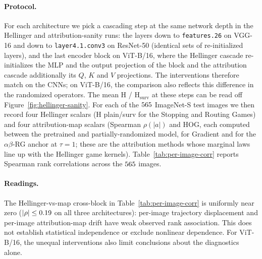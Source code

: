 \documentclass[twoside]{article}
\newcommand{\1}{\mathbf{1}}
\begin{document}
\paragraph{Protocol.}
For each architecture we pick a cascading step at the same network depth in the Hellinger
and attribution-sanity runs: the layers down to \texttt{features.26} on VGG-16 and down to
\texttt{layer4.1.conv3} on ResNet-50 (identical sets of re-initialized layers), and the last
encoder block on ViT-B/16, where the Hellinger cascade re-initializes the MLP and the output
projection of the block and the attribution cascade additionally its $Q$, $K$ and $V$ projections.
The interventions therefore match on the CNNs; on ViT-B/16, the comparison also reflects this
difference in the randomized operators.
The mean $\mathrm{H}$ / $\mathrm{H}_{\mathrm{surv}}$ at these steps can be read off
Figure~\ref{fig:hellinger-sanity}.  For each of the $\perImageN$ ImageNet-S test images we then
record four Hellinger scalars ($\mathrm{H}$ plain/surv for the Stopping and Routing Games) and four
attribution-map scalars (Spearman $\rho(|a|)$ and HOG, each computed between the pretrained and
partially-randomized model, for Gradient and for the $\alpha\beta$-\ac{RG} anchor at $\tau{=}1$;
these are the attribution methods whose marginal laws line up with the Hellinger game kernels).
Table~\ref{tab:per-image-corr} reports Spearman rank correlations across the $\perImageN$ images.

\begin{table}[H]
    \centering
    \scriptsize
    \setlength{\tabcolsep}{3.5pt}
    
    \caption{Per-image Spearman rank correlations across the $\perImageN$-image ImageNet-S test split
    at the selected cascading steps of the Hellinger and attribution-sanity pipelines. The randomized
    layers match on the CNNs; the ViT-B/16 attribution cascade additionally randomizes $Q$, $K$, and $V$.  Left block:
    within-Hellinger cross-correlations of the plain ($\mathrm{H}_{\cdot,\mathrm{pl}}$) and
    survival-conditioned ($\mathrm{H}_{\cdot,\mathrm{surv}}$) distances under the \ac{RG} and \ac{SG}
    kernels (self-entries shown as $-$; trivially $+1$).  Right block: Hellinger-vs-map
    cross-correlations.  The Hellinger-vs-map block is uniformly $|\rho| \leq \perImageCrossMax$:
    per-image Hellinger and per-image attribution-map similarity have weak observed rank association.}
    \label{tab:per-image-corr}
\end{table}

\paragraph{Readings.}
The Hellinger-vs-map cross-block in Table~\ref{tab:per-image-corr} is uniformly near zero ($|\rho|
    \leq \perImageCrossMax$ on all three architectures): per-image trajectory displacement and
per-image attribution-map drift have weak observed rank association. This does not establish
statistical independence or exclude nonlinear dependence. For ViT-B/16, the unequal interventions
also limit conclusions about the diagnostics alone.
\end{document}
